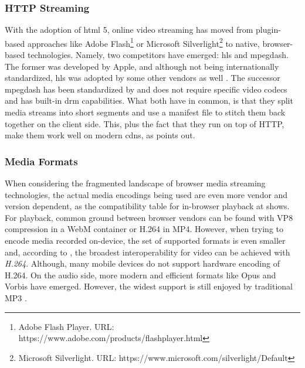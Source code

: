\subsubsection{HTTP Streaming}
\label{subsec:http-streaming}

With the adoption of \gls{html} 5, online video streaming has moved from plugin-based approaches like Adobe Flash\footnote{\label{adobe-flash}Adobe Flash Player. URL: {https://www.adobe.com/products/flashplayer.html}} or Microsoft Silverlight\footnote{\label{silverlight}Microsoft Silverlight. URL: {https://www.microsoft.com/silverlight/Default}} to native, browser-based technologies. Namely, two competitors have emerged: \gls{hls} and \gls{mpegdash}. The former was developed by Apple, and although not being internationally standardized, \gls{hls} was adopted by some other vendors as well \cite{caniuse-hls}. The successor \gls{mpegdash} has been standardized by \citet{iso-mpeg-dash} and does not require specific video codecs and has built-in \gls{drm} capabilities. What both have in common, is that they split media streams into short segments and use a manifest file to stitch them back together on the client side. This, plus the fact that they run on top of HTTP, make them work well on modern \glspl{cdn}, as \cite{hls-vs-dash} points out.

\subsubsection{Media Formats}

When considering the fragmented landscape of browser media streaming technologies, the actual media encodings being used are even more vendor and version dependent, as the compatibility table for in-browser playback at \cite{media-format-browser-compat} shows. For playback, common ground between browser vendors can be found with VP8 compression in a WebM container or H.264 in MP4. However, when trying to encode media recorded on-device, the set of supported formats is even smaller and, according to \citet[\S5.1]{webrtc-hacks-safari}, the broadest interoperability for video can be achieved with \textit{H.264}. Although, many mobile devices do not support hardware encoding of H.264. On the audio side, more modern and efficient formats like Opus and Vorbis have emerged. However, the widest support is still enjoyed by traditional MP3 \cite{media-format-browser-compat}.
